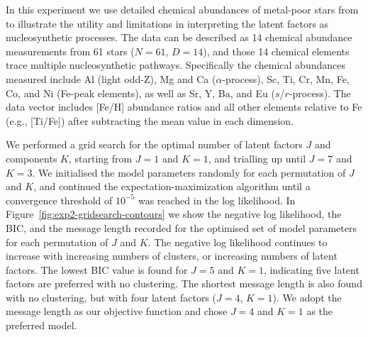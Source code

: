 \documentclass[twocolumn]{aastex62}
\newcommand{\NumData}{N}
\newcommand{\NumDimensions}{D}
\newcommand{\NumLatentFactors}{J}
\newcommand{\NumComponents}{K}
\begin{document}
In this experiment we use detailed chemical abundances of metal-poor stars 
from \citet{Barklem:2005} to illustrate the utility and limitations
in interpreting the latent factors as nucleosynthetic processes. The data 
can be described as 14 chemical abundance measurements from 61 stars ($\NumData = 61$, $\NumDimensions = 14$), and those 14 chemical elements trace multiple nucleosynthetic pathways. Specifically the chemical
abundances measured include Al (light odd-Z), Mg and Ca ($\alpha$-process), Sc, Ti, Cr, Mn, Fe, Co, and Ni (Fe-peak elements), as well as Sr, Y, Ba, and Eu ($s$/$r$-process). 
The data vector includes [Fe/H] abundance ratios and all other elements
relative to Fe (e.g., [Ti/Fe]) after subtracting the mean value in each dimension.

We performed a grid search for the optimal number of latent factors 
$\NumLatentFactors$ and components $\NumComponents$, starting from 
$\NumLatentFactors = 1$ and $K = 1$, and trialling up until 
$\NumLatentFactors = 7$ and $\NumComponents = 3$. 
We initialised
the model parameters randomly for each permutation of $J$ and $K$, and continued
the expectation-maximization algorithm
until a convergence threshold of $10^{-5}$ was reached in the log likelihood. 
In Figure~\ref{fig:exp2-gridsearch-contours} we show the negative log likelihood,
the BIC, and the message length recorded for the optimised set of model parameters 
for each permutation of $J$ and $K$. The negative log likelihood continues to
increase with increasing numbers of clusters, or increasing numbers of latent
factors.
The lowest BIC value is found for $J = 5$ and $K = 1$, indicating
five latent factors are preferred with no clustering. The shortest message length
is also found with no clustering,  but with four latent factors ($J = 4$, $K = 1$).
We adopt the message length as our objective function and chose $J = 4$ and $K = 1$
as the preferred model.
\end{document}
